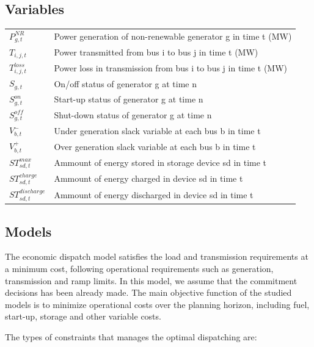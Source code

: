 \documentclass[12pt,LUDisStyle,twosided]{book}
\begin{document}
\subsection{Variables}

\begin{tabular}{ll}

$P^{NR}_{g,t} $& Power generation of non-renewable generator g in time t (MW)\\
$T_{i,j,t} $& Power transmitted from bus i to bus j in time t (MW)\\
$T^{loss}_{i,j,t} $& Power loss in transmission from bus i to bus j in time t (MW)\\
$S_{g,t} $& On/off status of generator g at time n\\
$S^{on}_{g,t} $& Start-up status of generator g at time n\\
$S^{off}_{g,t} $& Shut-down status of generator g at time n\\
$V^{-}_{b,t} $& Under generation slack variable at each bus b in time t\\
$V^{+}_{b,t} $& Over generation slack variable at each bus b in time t\\
$ST^{max}_{sd,t} $& Ammount of energy stored in storage device sd in time t\\
$ST^{charge}_{sd,t} $& Ammount of energy charged in device sd in time t\\
$ST^{discharge}_{sd,t} $& Ammount of energy discharged in device sd in time t\\

\end{tabular}

\subsection{Models}

The economic dispatch model satisfies the load and transmission requirements at a minimum cost, following operational requirements such as generation, transmission and ramp limits. In this model, we assume that the commitment decisions has been already made. The main objective function of the studied models is to minimize operational costs over the planning horizon, including fuel, start-up, storage and other variable costs.

The types of constraints that manages the optimal dispatching are:
\end{document}
